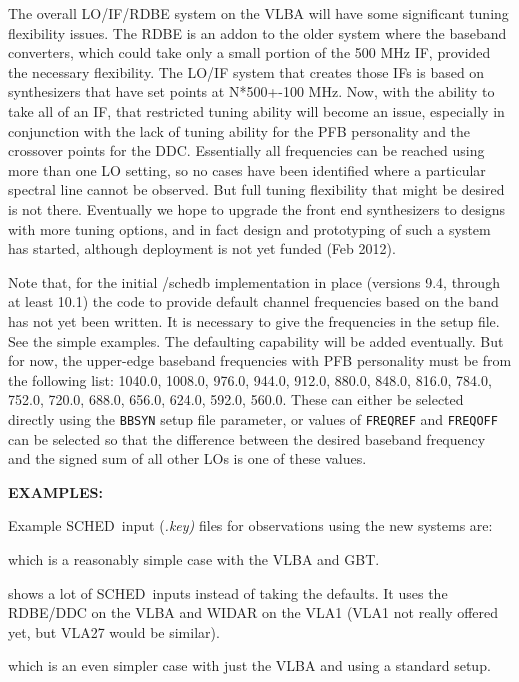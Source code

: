 \documentclass{report}
\newcommand{\schedb}{{\sc SCHED~}}
\begin{document}
The overall LO/IF/RDBE system on the VLBA will have some significant
tuning flexibility issues.  The RDBE is an addon to the older system
where the baseband converters, which could take only a small portion
of the 500 MHz IF, provided the necessary flexibility.  The LO/IF
system that creates those IFs is based on synthesizers that have
set points at N*500+-100 MHz.  Now, with the ability to take all of
an IF, that restricted tuning ability will become an issue, especially
in conjunction with the lack of tuning ability for the PFB personality
and the crossover points for the DDC.  Essentially all frequencies
can be reached using more than one LO setting, so no cases have been
identified where a particular spectral line cannot be observed.  But
full tuning flexibility that might be desired is not there.  Eventually
we hope to upgrade the front end synthesizers to designs with more
tuning options, and in fact design and prototyping of such a system
has started, although deployment is not yet funded (Feb 2012).

Note that, for the initial /schedb implementation in place (versions
9.4, through at least 10.1) the code to provide default channel
frequencies based on the band has not yet been written.  It is
necessary to give the frequencies in the setup file.  See the simple
examples.  The defaulting capability will be added eventually.  But
for now, the upper-edge baseband frequencies with PFB personality must
be from the following list: 1040.0, 1008.0, 976.0, 944.0, 912.0,
880.0, 848.0, 816.0, 784.0, 752.0, 720.0, 688.0, 656.0, 624.0, 592.0,
560.0.  These can either be selected directly using the {\tt BBSYN}
setup file parameter, or values of {\tt FREQREF} and {\tt FREQOFF}
can be selected so that the difference between the desired baseband
frequency and the signed sum of all other LOs is one of these values.

{\bf EXAMPLES:}

Example \schedb input {(\sl .key)} files for observations using the
new systems are: 

 which is
a reasonably simple case with the VLBA and GBT.

 shows
a lot of \schedb inputs instead of taking the defaults.  It uses
the RDBE/DDC on the VLBA and WIDAR on the VLA1 (VLA1 not really offered
yet, but VLA27 would be similar).

 which is
an even simpler case with just the VLBA and using a standard setup.
\end{document}
